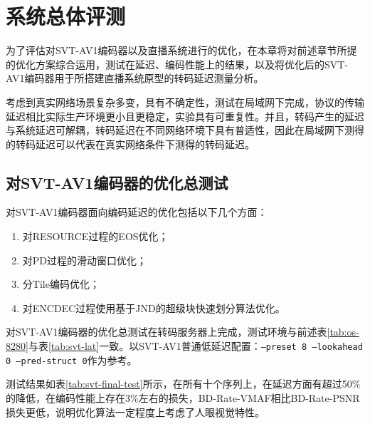 \chapter{系统总体评测}
为了评估对SVT-AV1编码器以及直播系统进行的优化，在本章将对前述章节所提的优化方案综合运用，测试在延迟、编码性能上的结果，以及将优化后的SVT-AV1编码器用于所搭建直播系统原型的转码延迟测量分析。

考虑到真实网络场景复杂多变，具有不确定性，测试在局域网下完成，协议的传输延迟相比实际生产环境更小且更稳定，实验具有可重复性。并且，转码产生的延迟与系统延迟可解耦，转码延迟在不同网络环境下具有普适性，因此在局域网下测得的转码延迟可以代表在真实网络条件下测得的转码延迟。
\section{对SVT-AV1编码器的优化总测试}
	对SVT-AV1编码器面向编码延迟的优化包括以下几个方面：
	\begin{enumerate}[label=\arabic*)]
		\item 对RESOURCE过程的EOS优化；
		\item 对PD过程的滑动窗口优化；
		\item 分Tile编码优化；
		\item 对ENCDEC过程使用基于JND的超级块快速划分算法优化。
	\end{enumerate}

	对SVT-AV1编码器的优化总测试在转码服务器上完成，测试环境与前述表\ref{tab:os-8280}与表\ref{tab:svt-lat}一致。以SVT-AV1普通低延迟配置：\texttt{--preset 8 --lookahead 0 --pred-struct 0}作为参考。

	测试结果如表\ref{tab:svt-final-test}所示，在所有十个序列上，在延迟方面有超过50\%的降低，在编码性能上存在3\%左右的损失，BD-Rate-VMAF相比BD-Rate-PSNR损失更低，说明优化算法一定程度上考虑了人眼视觉特性。


